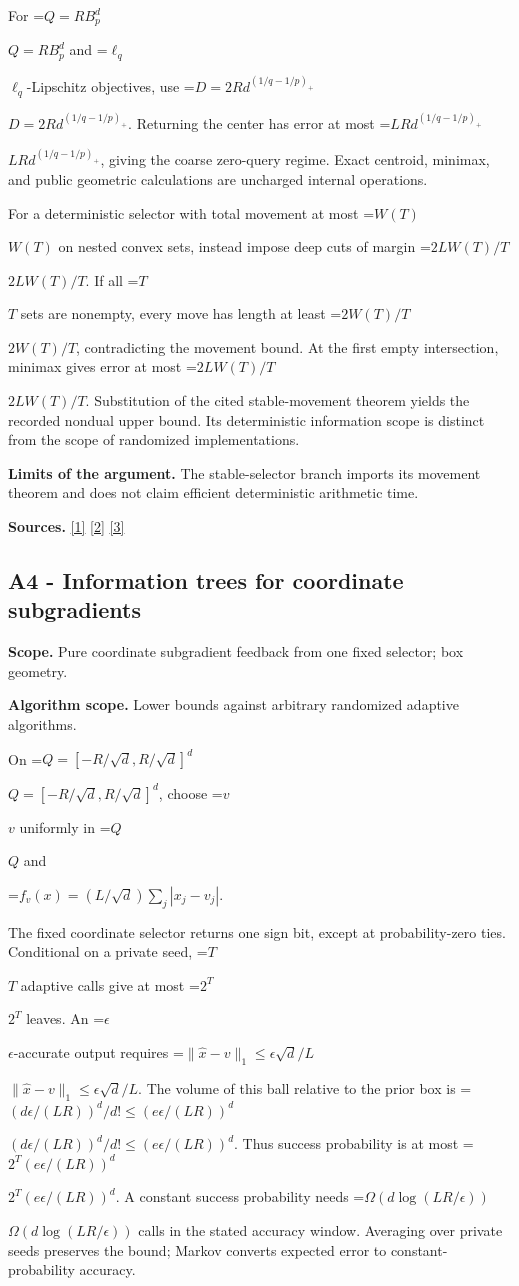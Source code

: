 \documentclass[10pt,a4paper]{article}
\newcommand{\AtlasMath}[1]{\par\begingroup\centering\setbox0=\hbox{$\displaystyle #1$}\ifdim\wd0>1.4\linewidth\typeout{ATLAS WIDE FORMULA: \the\wd0}\fi\ifdim\wd0>\linewidth\resizebox{\linewidth}{!}{\box0}\else\box0\fi\par\endgroup}
\newcommand{\AtlasInlineMath}[1]{\begingroup\setbox0=\hbox{$#1$}\ifdim\wd0>.4\linewidth\endgroup\AtlasMath{#1}\else\endgroup$#1$\fi}
\begin{document}
For \AtlasInlineMath{Q=RB_p^d} and \AtlasInlineMath{\ell_q}-Lipschitz objectives, use \AtlasInlineMath{D=2Rd^{(1/q-1/p)_+}}. Returning the center has error at most \AtlasInlineMath{LRd^{(1/q-1/p)_+}}, giving the coarse zero-query regime. Exact centroid, minimax, and public geometric calculations are uncharged internal operations.

For a deterministic selector with total movement at most \AtlasInlineMath{W(T)} on nested convex sets, instead impose deep cuts of margin \AtlasInlineMath{2LW(T)/T}. If all \AtlasInlineMath{T} sets are nonempty, every move has length at least \AtlasInlineMath{2W(T)/T}, contradicting the movement bound. At the first empty intersection, minimax gives error at most \AtlasInlineMath{2LW(T)/T}. Substitution of the cited stable-movement theorem yields the recorded nondual upper bound. Its deterministic information scope is distinct from the scope of randomized implementations.

\textbf{Limits of the argument.} The stable-selector branch imports its movement theorem and does not claim efficient deterministic arithmetic time.

\textbf{Sources.} \href{https://arxiv.org/pdf/1405.4980}{[1]} \href{https://www2.isye.gatech.edu/~nemirovs/MOR_AccuracyCertificates.pdf}{[2]} \href{https://arxiv.org/pdf/2609.20701}{[3]}

\subsection{A4 - Information trees for coordinate subgradients}
\textbf{Scope.} Pure coordinate subgradient feedback from one fixed selector; box geometry.

\textbf{Algorithm scope.} Lower bounds against arbitrary randomized adaptive algorithms.

On \AtlasInlineMath{Q=[-R/\sqrt d,R/\sqrt d]^d}, choose \AtlasInlineMath{v} uniformly in \AtlasInlineMath{Q} and

\AtlasMath{f_v(x)=(L/\sqrt d)\sum_j|x_j-v_j|.}

The fixed coordinate selector returns one sign bit, except at probability-zero ties. Conditional on a private seed, \AtlasInlineMath{T} adaptive calls give at most \AtlasInlineMath{2^T} leaves. An \AtlasInlineMath{\epsilon}-accurate output requires
\AtlasInlineMath{\|\widehat x-v\|_1\le\epsilon\sqrt d/L}.
The volume of this ball relative to the prior box is
\AtlasInlineMath{(d\epsilon/(LR))^d/d!\le(e\epsilon/(LR))^d}.
Thus success probability is at most
\AtlasInlineMath{2^T(e\epsilon/(LR))^d}.
A constant success probability needs \AtlasInlineMath{\Omega(d\log(LR/\epsilon))} calls in the stated accuracy window. Averaging over private seeds preserves the bound; Markov converts expected error to constant-probability accuracy.
\end{document}
